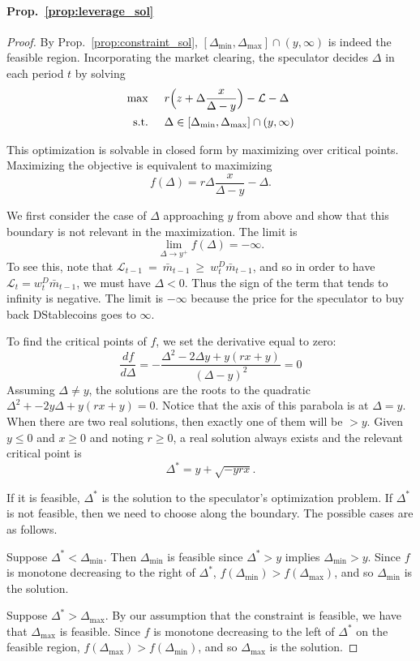 \paragraph{Prop.~\ref{prop:leverage_sol}} \hypertarget{pf:leverage_sol}{}
\begin{proof}
	By Prop.~\ref{prop:constraint_sol}, $[\Delta_{\min}, \Delta_{\max}] \cap (y, \infty)$ is indeed the feasible region.
	Incorporating the market clearing, the speculator decides $\Delta$ in each period $t$ by solving
	$$\begin{aligned}
	\max \hspace{0.5cm} & r\Big(z + \Delta \frac{x}{\Delta - y}\Big) - \mathcal{L} - \Delta \\
	\text{s.t.} \hspace{0.5cm} & \Delta \in [\Delta_{\min}, \Delta_{\max}] \cap (y, \infty)
	\end{aligned}$$
	
	This optimization is solvable in closed form by maximizing over critical points. Maximizing the objective is equivalent to maximizing
	$$f(\Delta) = r\Delta \frac{x}{\Delta - y} - \Delta.$$
	
	We first consider the case of $\Delta$ approaching $y$ from above and show that this boundary is not relevant in the maximization. The limit is
	$$\lim_{\Delta \rightarrow y^+} f(\Delta) = -\infty.$$
	To see this, note that $\mathcal{L}_{t-1} ~=~ \bar m_{t-1} ~\geq~ w^D_t \bar m_{t-1}$, and so in order to have $\mathcal{L}_t = w^D_t \bar m_{t-1}$, we must have $\Delta<0$. Thus the sign of the term that tends to infinity is negative. The limit is $-\infty$ because the price for the speculator to buy back DStablecoins goes to $\infty$.
	
	To find the critical points of $f$, we set the derivative equal to zero:
	$$\frac{df}{d\Delta} = -\frac{\Delta^2 - 2\Delta y + y(rx +y)}{(\Delta-y)^2}=0$$
	Assuming $\Delta \neq y$, the solutions are the roots to the quadratic
	$\Delta^2 + -2y\Delta + y(rx+y)=0$.
	Notice that the axis of this parabola is at $\Delta=y$. When there are two real solutions, then exactly one of them will be $>y$. Given $y\leq 0$ and $x\geq 0$ and noting $r\geq 0$, a real solution always exists and the relevant critical point is
	$$\Delta^* = y + \sqrt{-yrx}.$$
	
	If it is feasible, $\Delta^*$ is the solution to the speculator's optimization problem. If $\Delta^*$ is not feasible, then we need to choose along the boundary. The possible cases are as follows.
	
	Suppose $\Delta^* < \Delta_{\min}$. Then $\Delta_{\min}$ is feasible since $\Delta^*>y$ implies $\Delta_{\min}>y$. Since $f$ is monotone decreasing to the right of $\Delta^*$, $f(\Delta_{\min})>f(\Delta_{\max})$, and so $\Delta_{\min}$ is the solution.
	
	Suppose $\Delta^* > \Delta_{\max}$. By our assumption that the constraint is feasible, we have that $\Delta_{\max}$ is feasible. Since $f$ is monotone decreasing to the left of $\Delta^*$ on the feasible region, $f(\Delta_{\max})>f(\Delta_{\min})$, and so $\Delta_{\max}$ is the solution.
\end{proof}




